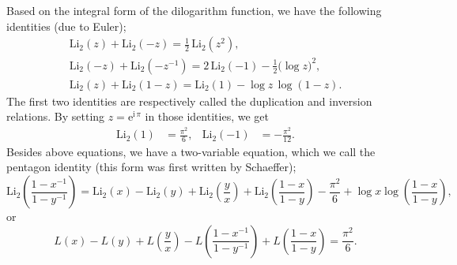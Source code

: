 \documentclass[12pt]{article}
\numberwithin{equation}{section}
\newcommand{\Li}{\mathrm{Li}_2}
\begin{document}
Based on the integral form of the dilogarithm function,
we have  the following identities (due to Euler);
\begin{gather}
  \label{Euler_1}
  \Li(z) + \Li(-z) = \frac{1}{2} \, \Li(z^2) ,
  \\[2mm]
%
  \Li(-z) + \Li(-z^{-1})
  = 2 \, \Li (-1) - \frac{1}{2} \bigl( \log  z  \bigr)^2,
  \label{inverse_Euler}
  \\[2mm]
%
  \Li(z) + \Li(1-z) = \Li(1) - \log z \, \log(1-z) .
\end{gather}
The first two identities are respectively called the duplication and inversion
relations.
By setting
$z= \mathrm{e}^{\mathrm{i} \, \pi}$ in those identities, we
get
\begin{align}
  \Li(1) &=
  \frac{\pi^2}{6} ,
  &
  \Li(-1) &=
  - \frac{\pi^2}{12} .
\end{align}
Besides above equations, we have a two-variable equation, which we
call  the pentagon identity
 (this form was first written by Schaeffer);
\begin{equation}
  \label{pentagon_Euler}
%
  \Li(\frac{1-x^{-1}}{1-y^{-1}})
  =
  \Li(x) - \Li(y) + \Li(\frac{y}{x})
  +
  \Li(\frac{1-x}{1-y})
  -\frac{\pi^2}{6}
  + \log x \log (\frac{1-x}{1-y}) ,
\end{equation}
or
\begin{equation}
      L(x) - L(y) + L(\frac{y}{x})
    -L(\frac{1-x^{-1}}{1-y^{-1}})
    +L(\frac{1-x}{1-y}) = \frac{\pi^2}{6} .
\end{equation}
\end{document}
